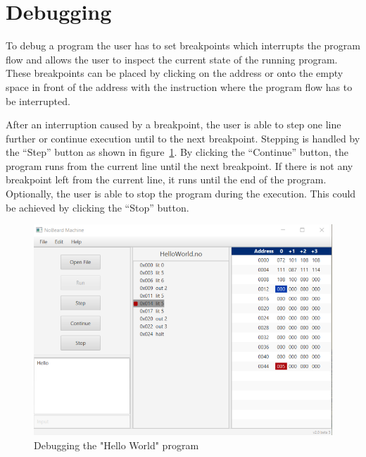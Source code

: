 \section{Debugging}
To debug a program the user has to set breakpoints which interrupts the program flow and allows the user to inspect the current state of the running program. These breakpoints can be placed by clicking on the address or onto the empty space in front of the address with the instruction where the program flow has to be interrupted. 

After an interruption caused by a breakpoint, the user is able to step one line further or continue execution until to the next breakpoint. Stepping is handled by the “Step” button as shown in figure~\ref{fig:debugging}. By clicking the “Continue” button, the program runs from the current line until the next breakpoint. If there is not any breakpoint left from the current line, it runs until the end of the program. Optionally, the user is able to stop the program during the execution. This could be achieved by clicking the “Stop” button.
\begin{figure}[h] 
	\centering
	\includegraphics[scale=.85]{images/screenshot-2.png}
	\caption{Debugging the "Hello World" program}
	\label{fig:debugging}
\end{figure}

